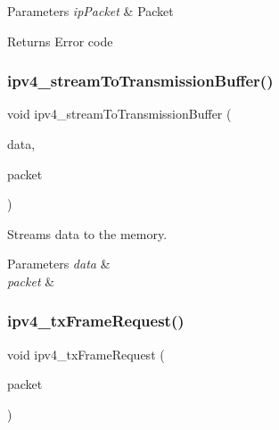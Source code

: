 \begin{DoxyParams}{Parameters}
{\em ip\+Packet} & Packet \\
\hline
\end{DoxyParams}
\begin{DoxyReturn}{Returns}
Error code 
\end{DoxyReturn}
\mbox{\label{group__ip_ga6b56766f821375422e6457b30c26d9f4}} 
\subsubsection{\texorpdfstring{ipv4\_streamToTransmissionBuffer()}{ipv4\_streamToTransmissionBuffer()}}
{\footnotesize\ttfamily void ipv4\+\_\+stream\+To\+Transmission\+Buffer (\begin{DoxyParamCaption}\item[{unsigned char}]{data,  }\item[{\mbox{\hyperlink{ipv4_types_8h_a1a3db8172a6bdf4bb1957929ca11710c}{I\+Pv4\+Packet}}}]{packet }\end{DoxyParamCaption})}



Streams data to the memory. 


\begin{DoxyParams}{Parameters}
{\em data} & \\
\hline
{\em packet} & \\
\hline
\end{DoxyParams}
\mbox{\label{group__ip_ga201c03909f1133c33424a0b9a27097cd}} 
\subsubsection{\texorpdfstring{ipv4\_txFrameRequest()}{ipv4\_txFrameRequest()}}
{\footnotesize\ttfamily void ipv4\+\_\+tx\+Frame\+Request (\begin{DoxyParamCaption}\item[{\mbox{\hyperlink{ipv4_types_8h_a1a3db8172a6bdf4bb1957929ca11710c}{I\+Pv4\+Packet}} $\ast$}]{packet }\end{DoxyParamCaption})}



